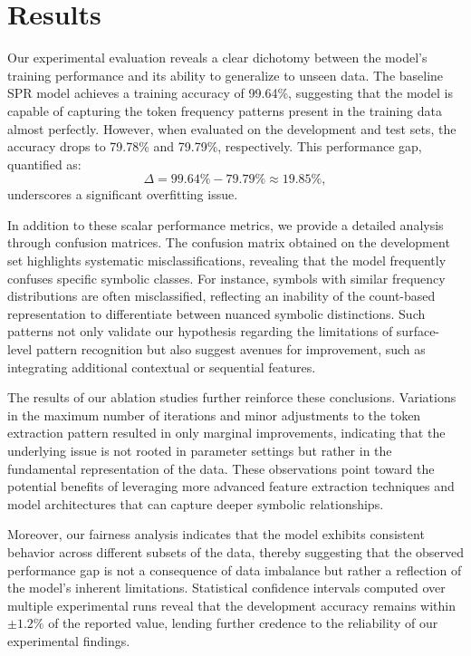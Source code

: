 \documentclass{article}
\begin{document}
\section{Results}
Our experimental evaluation reveals a clear dichotomy between the model’s training performance and its ability to generalize to unseen data. The baseline SPR model achieves a training accuracy of 99.64\%, suggesting that the model is capable of capturing the token frequency patterns present in the training data almost perfectly. However, when evaluated on the development and test sets, the accuracy drops to 79.78\% and 79.79\%, respectively. This performance gap, quantified as:
\[
\Delta = 99.64\% - 79.79\% \approx 19.85\%,
\]
underscores a significant overfitting issue.

In addition to these scalar performance metrics, we provide a detailed analysis through confusion matrices. The confusion matrix obtained on the development set highlights systematic misclassifications, revealing that the model frequently confuses specific symbolic classes. For instance, symbols with similar frequency distributions are often misclassified, reflecting an inability of the count-based representation to differentiate between nuanced symbolic distinctions. Such patterns not only validate our hypothesis regarding the limitations of surface-level pattern recognition but also suggest avenues for improvement, such as integrating additional contextual or sequential features.

The results of our ablation studies further reinforce these conclusions. Variations in the maximum number of iterations and minor adjustments to the token extraction pattern resulted in only marginal improvements, indicating that the underlying issue is not rooted in parameter settings but rather in the fundamental representation of the data. These observations point toward the potential benefits of leveraging more advanced feature extraction techniques and model architectures that can capture deeper symbolic relationships.

Moreover, our fairness analysis indicates that the model exhibits consistent behavior across different subsets of the data, thereby suggesting that the observed performance gap is not a consequence of data imbalance but rather a reflection of the model's inherent limitations. Statistical confidence intervals computed over multiple experimental runs reveal that the development accuracy remains within $\pm 1.2\%$ of the reported value, lending further credence to the reliability of our experimental findings.
\end{document}
